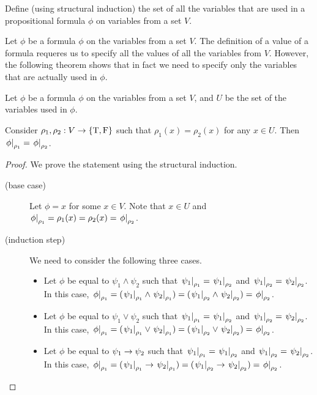 \begin{exercise}
  Define (using structural induction) the set of all the variables that are
  used in a propositional formula $\phi$ on variables from a set $V$.
\end{exercise}

Let $\phi$ be a formula $\phi$ on the variables from a set $V$. The definition
of a value of a formula requeres us to specify all the values of all the
variables from $V$. However, the following theorem shows that in
fact we need to specify only the variables that are actually used in $\phi$.
\begin{theorem}
  Let $\phi$ be a formula $\phi$ on the variables from a set $V$,
  and $U$ be the set of the variables used in $\phi$.

  Consider $\rho_1, \rho_2 : V \to \set{\ltrue, \lfalse}$ such that
  $\rho_1(x) = \rho_2(x)$ for any $x \in U$.
  Then $\left. {\phi} \right\rvert_{\rho_1} = \left. {\phi} \right\rvert_{\rho_2}$.
\end{theorem}
\begin{proof}
  We prove the statement using the structural induction.
  \begin{description}
    \item[(base case)] Let $\phi = x$ for some $x \in V$.
      Note that $x \in U$ and $\left. {\phi} \right\rvert_{\rho_1} = \rho_1(x) =
      \rho_2(x) = \left. {\phi} \right\rvert_{\rho_2}$.
    \item[(induction step)] We need to consider the following three cases.
      \begin{itemize}
        \item Let $\phi$ be equal to $\psi_1 \land \psi_2$ such that
          $\left. {\psi_1} \right\rvert_{\rho_1} = \left. {\psi_1} \right\rvert_{\rho_2}$ and
          $\left. {\psi_1} \right\rvert_{\rho_2} = \left. {\psi_2} \right\rvert_{\rho_2}$.
          In this case,
          $\left. {\phi} \right\rvert_{\rho_1} =
            (\left. {\psi_1} \right\rvert_{\rho_1} \land \left. {\psi_2} \right\rvert_{\rho_1} )=
            (\left. {\psi_1} \right\rvert_{\rho_2} \land \left. {\psi_2} \right\rvert_{\rho_2}) =
            \left. {\phi} \right\rvert_{\rho_2}$.
        \item Let $\phi$ be equal to $\psi_1 \lor \psi_2$ such that
          $\left. {\psi_1} \right\rvert_{\rho_1} = \left. {\psi_1} \right\rvert_{\rho_2}$ and
          $\left. {\psi_1} \right\rvert_{\rho_2} = \left. {\psi_2} \right\rvert_{\rho_2}$.
          In this case,
          $\left. {\phi} \right\rvert_{\rho_1} =
            (\left. {\psi_1} \right\rvert_{\rho_1} \lor \left. {\psi_2} \right\rvert_{\rho_1}) =
            (\left. {\psi_1} \right\rvert_{\rho_2} \lor \left. {\psi_2} \right\rvert_{\rho_2}) =
            \left. {\phi} \right\rvert_{\rho_2}$.
        \item Let $\phi$ be equal to $\psi_1 \rightarrow \psi_2$ such that
          $\left. {\psi_1} \right\rvert_{\rho_1} = \left. {\psi_1} \right\rvert_{\rho_2}$ and
          $\left. {\psi_1} \right\rvert_{\rho_2} = \left. {\psi_2} \right\rvert_{\rho_2}$.
          In this case,
          $\left. {\phi} \right\rvert_{\rho_1} =
            (\left. {\psi_1} \right\rvert_{\rho_1} \rightarrow \left. {\psi_2} \right\rvert_{\rho_1}) =
            (\left. {\psi_1} \right\rvert_{\rho_2} \rightarrow \left. {\psi_2} \right\rvert_{\rho_2}) =
            \left. {\phi} \right\rvert_{\rho_2}$.
      \end{itemize}
  \end{description}
\end{proof}

